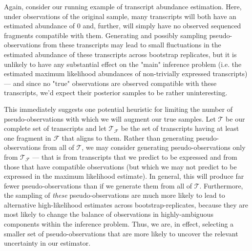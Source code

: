 Again, consider our running example of transcript abundance estimation. Here, under observations 
of the original sample, many transcripts will both have an estimated abundance of 0 and, further, 
will simply have no observed sequenced fragments compatible with them.  Generating and possibly 
sampling pseudo-observations from these transcripts may lead to small fluctuations in the estimated 
abundance of these transcripts across bootstrap replicates, but it is unlikely to have any 
substantial effect on the "main" inference problem (i.e. the estimated maximum likelihood 
abundances of non-trivially expressed transcripts) — and since no "true" observations are 
observed compatible with these transcripts, we'd expect their posterior samples to be rather 
uninteresting.

This immediately suggests one potential heuristic for limiting the number of pseudo-observations 
with which we will augment our true samples. Let $\mathcal{T}$ be our complete set of transcripts 
and let $\mathcal{T}_\mathcal{F}$ be the set of transcripts having at least one fragment in 
$\mathcal{F}$ that aligns to them.  Rather than generating pseudo-observations from all of 
$\mathcal{T}$, we may consider generating pseudo-observations only from 
$\mathcal{T}_\mathcal{F}$ — that is from transcripts that we predict to be expressed and from those 
that have compatible observations (but which we may not predict to be expressed in the maximum 
likelihood estimate). In general, this will produce far fewer pseudo-observations than if we 
generate them from all of $\mathcal{T}$. Furthermore, the sampling of \textit{these} 
pseudo-observations are much more likely to lead to alternative high-likelihood estimates across 
bootstrap-replicates, because they are most likely to change the balance of observations in 
highly-ambiguous components within the inference problem.  Thus, we are, in effect, selecting a 
smaller set of pseudo-observations that are more likely to uncover the relevant uncertainty 
in our estimator.

